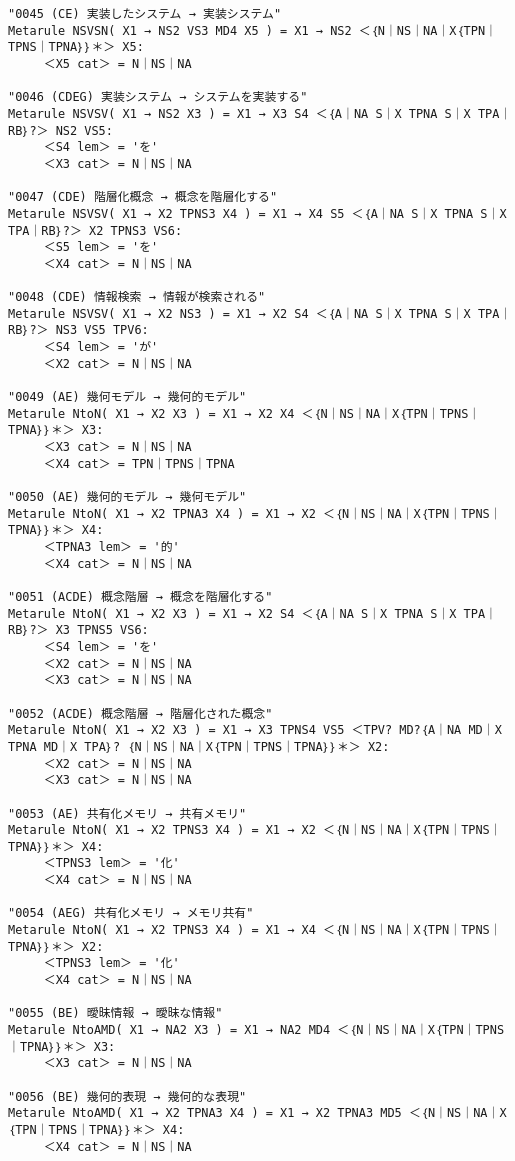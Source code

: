 {\begin{verbatim}
"0045 (CE) 実装したシステム → 実装システム"
Metarule NSVSN( X1 → NS2 VS3 MD4 X5 ) = X1 → NS2 ＜｛N｜NS｜NA｜X｛TPN｜TPNS｜TPNA｝｝＊＞ X5:
     ＜X5 cat＞ = N｜NS｜NA

"0046 (CDEG) 実装システム → システムを実装する"
Metarule NSVSV( X1 → NS2 X3 ) = X1 → X3 S4 ＜｛A｜NA S｜X TPNA S｜X TPA｜RB｝?＞ NS2 VS5:
     ＜S4 lem＞ = 'を'
     ＜X3 cat＞ = N｜NS｜NA

"0047 (CDE) 階層化概念 → 概念を階層化する"
Metarule NSVSV( X1 → X2 TPNS3 X4 ) = X1 → X4 S5 ＜｛A｜NA S｜X TPNA S｜X TPA｜RB｝?＞ X2 TPNS3 VS6:
     ＜S5 lem＞ = 'を'
     ＜X4 cat＞ = N｜NS｜NA

"0048 (CDE) 情報検索 → 情報が検索される"
Metarule NSVSV( X1 → X2 NS3 ) = X1 → X2 S4 ＜｛A｜NA S｜X TPNA S｜X TPA｜RB｝?＞ NS3 VS5 TPV6:
     ＜S4 lem＞ = 'が'
     ＜X2 cat＞ = N｜NS｜NA

"0049 (AE) 幾何モデル → 幾何的モデル"
Metarule NtoN( X1 → X2 X3 ) = X1 → X2 X4 ＜｛N｜NS｜NA｜X｛TPN｜TPNS｜TPNA｝｝＊＞ X3:
     ＜X3 cat＞ = N｜NS｜NA
     ＜X4 cat＞ = TPN｜TPNS｜TPNA

"0050 (AE) 幾何的モデル → 幾何モデル"
Metarule NtoN( X1 → X2 TPNA3 X4 ) = X1 → X2 ＜｛N｜NS｜NA｜X｛TPN｜TPNS｜TPNA｝｝＊＞ X4:
     ＜TPNA3 lem＞ = '的'
     ＜X4 cat＞ = N｜NS｜NA

"0051 (ACDE) 概念階層 → 概念を階層化する"
Metarule NtoN( X1 → X2 X3 ) = X1 → X2 S4 ＜｛A｜NA S｜X TPNA S｜X TPA｜RB｝?＞ X3 TPNS5 VS6:
     ＜S4 lem＞ = 'を'
     ＜X2 cat＞ = N｜NS｜NA
     ＜X3 cat＞ = N｜NS｜NA

"0052 (ACDE) 概念階層 → 階層化された概念"
Metarule NtoN( X1 → X2 X3 ) = X1 → X3 TPNS4 VS5 ＜TPV? MD?｛A｜NA MD｜X TPNA MD｜X TPA｝? ｛N｜NS｜NA｜X｛TPN｜TPNS｜TPNA｝｝＊＞ X2:
     ＜X2 cat＞ = N｜NS｜NA
     ＜X3 cat＞ = N｜NS｜NA

"0053 (AE) 共有化メモリ → 共有メモリ"
Metarule NtoN( X1 → X2 TPNS3 X4 ) = X1 → X2 ＜｛N｜NS｜NA｜X｛TPN｜TPNS｜TPNA｝｝＊＞ X4:
     ＜TPNS3 lem＞ = '化'
     ＜X4 cat＞ = N｜NS｜NA

"0054 (AEG) 共有化メモリ → メモリ共有"
Metarule NtoN( X1 → X2 TPNS3 X4 ) = X1 → X4 ＜｛N｜NS｜NA｜X｛TPN｜TPNS｜TPNA｝｝＊＞ X2:
     ＜TPNS3 lem＞ = '化'
     ＜X4 cat＞ = N｜NS｜NA

"0055 (BE) 曖昧情報 → 曖昧な情報"
Metarule NtoAMD( X1 → NA2 X3 ) = X1 → NA2 MD4 ＜｛N｜NS｜NA｜X｛TPN｜TPNS｜TPNA｝｝＊＞ X3:
     ＜X3 cat＞ = N｜NS｜NA

"0056 (BE) 幾何的表現 → 幾何的な表現"
Metarule NtoAMD( X1 → X2 TPNA3 X4 ) = X1 → X2 TPNA3 MD5 ＜｛N｜NS｜NA｜X｛TPN｜TPNS｜TPNA｝｝＊＞ X4:
     ＜X4 cat＞ = N｜NS｜NA


\end{verbatim}}
